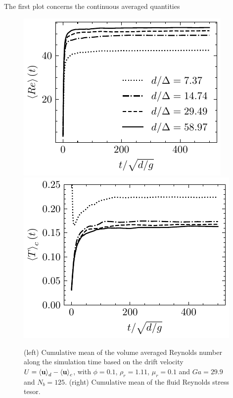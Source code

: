 The first plot concerns the continuous averaged quantities
\begin{figure}[h!]
    \centering
    \includegraphics[height = 0.3\textwidth]{image/VALIDATION2.0/fCA/Recum.pdf}
    \includegraphics[height = 0.3\textwidth]{image/VALIDATION2.0/fCA/Tcum.pdf}
    \caption{(left) Cumulative mean of the volume averaged Reynolds number along the simulation time based on the drift velocity $U = \left<\textbf{u}\right>_d - \left<\textbf{u}\right>_c$, with $\phi = 0.1$, $\rho_r = 1.11$, $ \mu_r =0.1$ and $Ga = 29.9$ and $N_b = 125$.
    (right) Cumulative mean of the fluid Reynolds stress tesor. }
\end{figure}

